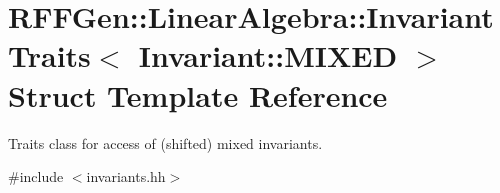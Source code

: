 \hypertarget{structRFFGen_1_1LinearAlgebra_1_1InvariantTraits_3_01Invariant_1_1MIXED_01_4}{\section{R\-F\-F\-Gen\-:\-:Linear\-Algebra\-:\-:Invariant\-Traits$<$ Invariant\-:\-:M\-I\-X\-E\-D $>$ Struct Template Reference}
\label{structRFFGen_1_1LinearAlgebra_1_1InvariantTraits_3_01Invariant_1_1MIXED_01_4}
}


Traits class for access of (shifted) mixed invariants.  




{\ttfamily \#include $<$invariants.\-hh$>$}

